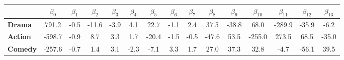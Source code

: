 \begin{tabular}{|l|c|c|c|c|c|c|c|c|c|c|c|c|c|c|}
\hline
&\textbf{$\beta_{0}$}&\textbf{$\beta_{1}$}&\textbf{$\beta_{2}$}&\textbf{$\beta_{3}$}&\textbf{$\beta_{4}$}&\textbf{$\beta_{5}$}&\textbf{$\beta_{6}$}&\textbf{$\beta_{7}$}&\textbf{$\beta_{8}$}&\textbf{$\beta_{9}$}&\textbf{$\beta_{10}$}&\textbf{$\beta_{11}$}&\textbf{$\beta_{12}$}&\textbf{$\beta_{13}$}\\\hline
\textbf{Drama}&791.2&-0.5&-11.6&-3.9&4.1&22.7&-1.1&2.4&37.5&-38.8&68.0&-289.9&-35.9&-6.2\\\hline
\textbf{Action}&-598.7&-0.9&8.7&3.3&1.7&-20.4&-1.5&-0.5&-47.6&53.5&-255.0&273.5&68.5&-35.0\\\hline
\textbf{Comedy}&-257.6&-0.7&1.4&3.1&-2.3&-7.1&3.3&1.7&27.0&37.3&32.8&-4.7&-56.1&39.5\\\hline
\end{tabular}
